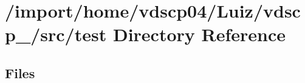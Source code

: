 \section{/import/home/vdscp04/\+Luiz/vdscp\+\_/src/test Directory Reference}
\label{dir_120ed4da3e3217b1e7fc0b4f48568e79}
\subsection*{Files}
\begin{DoxyCompactItemize}
\end{DoxyCompactItemize}

